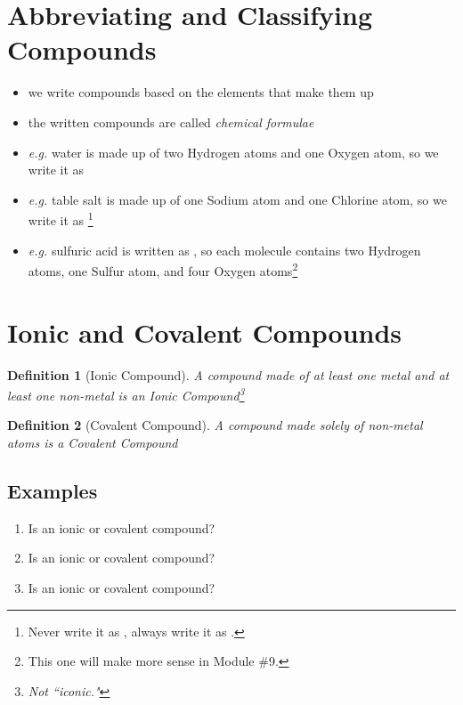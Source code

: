 \documentclass[11pt, oneside]{article}   	%
\newtheorem{definition}{Definition}
\begin{document}
\section{Abbreviating and Classifying Compounds}
\begin{itemize}
\item we write compounds based on the elements that make them up
\item the written compounds are called \emph{chemical formulae}
\item \emph{e.g.} water is made up of two Hydrogen atoms and one Oxygen atom, so we write it as 
\item \emph{e.g.} table salt is made up of one Sodium atom and one Chlorine atom, so we write it as \footnote{Never write it as , always write it as .}
\item \emph{e.g.} sulfuric acid is written as , so each molecule contains two Hydrogen atoms, one Sulfur atom, and four Oxygen atoms\footnote{This one will make more sense in Module \#9.}
\end{itemize}


\section{Ionic and Covalent Compounds}
\begin{definition}[Ionic Compound]
A compound made of at least one metal and at least one non-metal is an \emph{Ionic Compound}\footnote{\emph{Not} ``iconic."}
\end{definition}

\begin{definition}[Covalent Compound]
A compound made solely of non-metal atoms is a \emph{Covalent Compound}
\end{definition}

\subsection{Examples}
\begin{enumerate}[label=Example \arabic*]
\item Is  an ionic or covalent compound?
\item Is  an ionic or covalent compound?
\item Is  an ionic or covalent compound?
 \end{enumerate}
\end{document}
